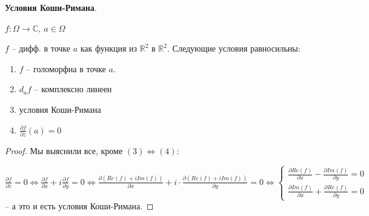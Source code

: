 \begin{theorem}
    \textbf{Условия Коши-Римана}.

    $f: \Omega \rightarrow \mathbb{C}, \ a \in \Omega$

    $f$ -- дифф. в точке $a$ как функция из $\mathbb{R}^2$ в $\mathbb{R}^2$. Следующие условия равносильны:

    \begin{enumerate}
        \item {
            $f$ -- голоморфна в точке $a$.
        }
        \item {
            $d_a f$ -- комплексно линеен
        }
        \item {
            условия Коши-Римана
        }
        \item {
            $\frac{\partial f}{\partial \overline{z}} (a) = 0$
        }
    \end{enumerate}
\end{theorem}

\begin{proof}
    Мы выяснили все, кроме $(3) \Leftrightarrow (4)$:

    $\frac{\partial f}{\partial \overline{z}} = 0 \Leftrightarrow \frac{\partial f}{\partial x} + i \frac{\partial f}{\partial y} = 0 \Leftrightarrow \frac{\partial (Re(f) + i Im(f))}{\partial x} + i \cdot \frac{\partial (Re (f) + i Im (f))}{\partial y} = 0 \Leftrightarrow \begin{cases}
        \frac{\partial Re(f)}{\partial x} - \frac{\partial Im (f)}{\partial y} = 0 \\
        \frac{\partial Im(f)}{\partial x} + \frac{\partial Re(f)}{\partial y} = 0
    \end{cases}$ -- а это и есть условия Коши-Римана.
\end{proof}


